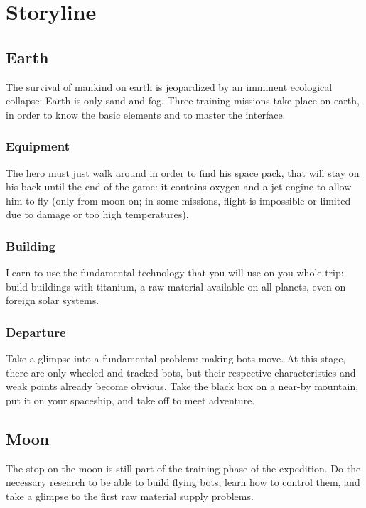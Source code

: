 \chapter{Storyline}


\section{Earth}

The survival of mankind on earth is jeopardized by an imminent ecological collapse: Earth is only sand and fog. Three training missions take place on earth, in order to know the basic elements and to master the interface.


\subsection{Equipment}

The hero must just walk around in order to find his space pack, that will stay on his back until the end of the game: it contains oxygen and a jet engine to allow him to fly (only from moon on; in some missions, flight is impossible or limited due to damage or too high temperatures).


\subsection{Building}

Learn to use the fundamental technology that you will use on you whole trip: build buildings with titanium, a raw material available on all planets, even on foreign solar systems.


\subsection{Departure}

Take a glimpse into a fundamental problem: making bots move. At this stage, there are only wheeled and tracked bots, but their respective characteristics and weak points already become obvious. Take the black box on a near-by mountain, put it on your spaceship, and take off to meet adventure.


\section{Moon}

The stop on the moon is still part of the training phase of the expedition. Do the necessary research to be able to build flying bots, learn how to control them, and take a glimpse to the first raw material supply problems.



